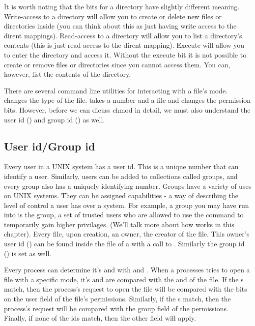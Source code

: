 It is worth noting that the  bits for a directory have slightly different meaning. Write-access to a directory will allow you to create or delete new files or directories inside (you can think about this as just having write access to the dirent mappings). Read-access to a directory will allow you to list a directory's contents (this is just read access to the dirent mapping). Execute will allow you to enter the directory and access it. Without the execute bit it is not possible to create or remove files or directories since you cannot access them. You can, however, list the contents of the directory.

There are several command line utilities for interacting with a file's mode.  changes the type of the file.  takes a number and a file and changes the permission bits. However, before we can dicuss chmod in detail, we must also understand the user id () and group id () as well.

\subsection{User id/Group id}
Every user in a UNIX system has a user id. This is a unique number that can identify a user. Similarly, users can be added to collections called groups, and every group also has a uniquely identifying number. Groups have a variety of uses on UNIX systems. They can be assigned capabilities - a way of describing the level of control a user has over a system. For example, a group you may have run into is the  group, a set of trusted users who are allowed to use the command  to temporarily gain higher privilages. (We'll talk more about how  works in this chapter). Every file, upon creation, an owner, the creator of the file. This owner's user id () can be found inside the  file of a  with a call to . Similarly the group id () is set as well.

Every process can determine it's  and  with  and . When a processes tries to open a file with a specific mode, it's  and  are compared with the  and  of the file. If the s match, then the process's request to open the file will be compared with the bits on the user field of the file's permissions. Similarly, if the s match, then the process's request will be compared with the group field of the permissions. Finally, if none of the ids match, then the other field will apply.

